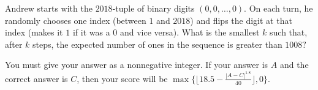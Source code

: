 Andrew starts with the $2018$-tuple of binary digits $(0,0,\dots,0)$. On each turn, he randomly chooses one index (between $1$ and $2018$) and flips the digit at that index (makes it $1$ if it was a $0$ and vice versa). What is the smallest $k$ such that, after $k$ steps, the expected number of ones in the sequence is greater than $1008?$

You must give your answer as a nonnegative integer. If your answer is $A$ and the correct answer is $C$,  then your score will be $\max\{\lfloor18.5-\tfrac{|A-C|^{1.8}}{40}\rfloor,0\}.$